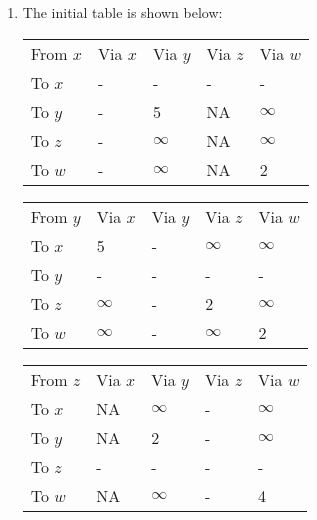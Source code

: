 \begin{enumerate}
      \item The initial table is shown below:
            \begin{table}[H]
                  \centering
                  \begin{tabular}{lllll}
                        From $x$ & Via $x$ & Via $y$  & Via $z$ & Via $w$  \\
                        To $x$   & -       & -        & -       & -        \\
                        To $y$   & -       & 5        & NA      & $\infty$ \\
                        To $z$   & -       & $\infty$ & NA      & $\infty$ \\
                        To $w$   & -       & $\infty$ & NA      & 2
                  \end{tabular}

                  \vspace{5mm}

                  \begin{tabular}{lllll}
                        From $y$ & Via $x$  & Via $y$ & Via $z$  & Via $w$  \\
                        To $x$   & 5        & -       & $\infty$ & $\infty$ \\
                        To $y$   & -        & -       & -        & -        \\
                        To $z$   & $\infty$ & -       & 2        & $\infty$ \\
                        To $w$   & $\infty$ & -       & $\infty$ & 2
                  \end{tabular}

                  \vspace{5mm}

                  \begin{tabular}{lllll}
                        From $z$ & Via $x$ & Via $y$  & Via $z$ & Via $w$  \\
                        To $x$   & NA      & $\infty$ & -       & $\infty$ \\
                        To $y$   & NA      & 2        & -       & $\infty$ \\
                        To $z$   & -       & -        & -       & -        \\
                        To $w$   & NA      & $\infty$ & -       & 4
                  \end{tabular}


\end{table}
\end{enumerate}
